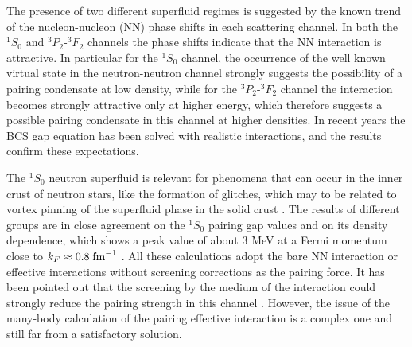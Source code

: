 The presence of two different superfluid regimes 
is suggested by the known trend of the 
nucleon-nucleon (NN) phase shifts 
in each scattering channel. 
In both the $^1S_0$ and $^3P_2$-$^3F_2$ channels the
phase shifts indicate that the NN interaction is attractive. 
In particular for the $^1S_0$ channel, the occurrence of 
the well known virtual state in the neutron-neutron channel
strongly suggests the possibility of a 
pairing condensate at low density, 
while for the $^3P_2$-$^3F_2$ channel the 
interaction becomes strongly attractive only
at higher energy, which therefore suggests a possible 
pairing condensate
in this channel at higher densities. 
In recent years the BCS gap equation
has been solved with realistic interactions, 
and the results confirm
these expectations. 

The $^1S_0$ neutron superfluid is relevant for phenomena
that can occur in the inner crust of neutron stars, like the 
formation of glitches, which may to be related to vortex pinning  
of the superfluid phase in the solid crust \cite{glitch}. 
The results of different groups are in close agreement
on the $^1S_0$ pairing gap values and on 
its density dependence, which
shows a peak value of about 3 MeV at a Fermi momentum close to
$k_F \approx 0.8\; {\rm fm}^{-1}$ \cite{bcll90,kkc96,eh98,sclbl96}. 
All these calculations adopt the bare
NN interaction or effective interactions without screening 
corrections as the pairing force. It has been pointed out
that the screening by the medium of the interaction 
could strongly reduce
the pairing strength in this channel \cite{sclbl96,chen86,ains89}. 
However, the issue of the 
many-body calculation of the pairing 
effective interaction is a complex
one and still far from a satisfactory solution.

